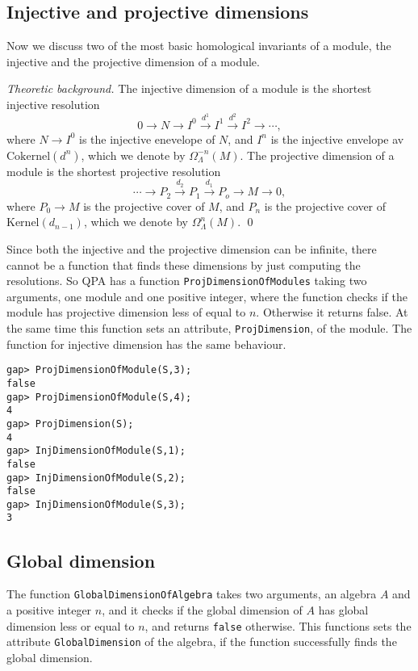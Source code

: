 \documentclass{amsart}
\theoremstyle{definition}
\newcommand{\code}[1]{\texttt{#1}}
\theoremstyle{theoretic}
\newenvironment{theoback}
{\medskip\small\textit{Theoretic background.} }
{\qed\par\medskip}
\begin{document}
\subsection{Injective and projective dimensions}
Now we discuss two of the most basic homological invariants of a
module, the injective and the projective dimension of a module. 

\begin{theoback}
The injective dimension of a module is the shortest injective
resolution
\[0\to N\to I^0\xrightarrow{d^1} I^1\xrightarrow{d^2} I^2\to \cdots, \]
where $N\to I^0$ is the injective enevelope of $N$, and $I^{n}$ is the
injective envelope av $\textrm{Cokernel}(d^n)$, which we denote by
$\Omega^{-n}_\Lambda(M)$.  The projective dimension of a module is the
shortest projective resolution
\[
\cdots \to P_2\xrightarrow{d_2} P_1\xrightarrow{d_1} P_o\to M\to 0,
\]
where $P_0\to M$ is the projective cover of $M$, and $P_n$ is the
projective cover of $\textrm{Kernel}(d_{n-1})$, which we denote by
$\Omega^n_\Lambda(M)$. 
\end{theoback}
Since both the injective and the projective dimension can be infinite,
there cannot be a function that finds these dimensions by just
computing the resolutions.  So QPA has a function
\code{ProjDimensionOfModules} taking two arguments, one module and one
positive integer, where the function checks if the module has
projective dimension less of equal to $n$.  Otherwise it returns
false. At the same time this function sets an attribute,
\code{ProjDimension}, of the module.  The function for injective
dimension has the same behaviour. 

\begin{verbatim}
gap> ProjDimensionOfModule(S,3);
false
gap> ProjDimensionOfModule(S,4);
4
gap> ProjDimension(S);
4
gap> InjDimensionOfModule(S,1); 
false
gap> InjDimensionOfModule(S,2);
false
gap> InjDimensionOfModule(S,3);
3
\end{verbatim}

\subsection{Global dimension}
The function \code{GlobalDimensionOfAlgebra} takes two arguments, an
algebra $A$ and a positive integer $n$, and it checks if the global
dimension of $A$ has global dimension less or equal to $n$, and
returns \code{false} otherwise.  This functions sets the attribute
\code{GlobalDimension} of the algebra, if the function successfully
finds the global dimension. 
\end{document}
